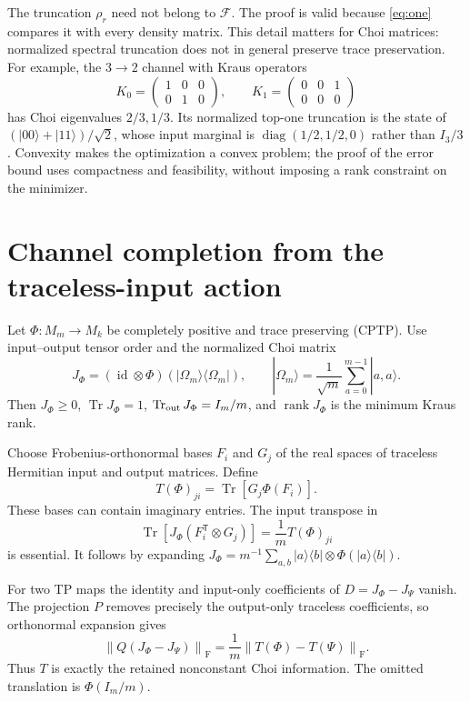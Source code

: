 \documentclass[11pt,a4paper]{article}
\newcommand{\Tr}{\operatorname{Tr}}
\newcommand{\rank}{\operatorname{rank}}
\newcommand{\id}{\operatorname{id}}
\newcommand{\F}{\mathrm F}
\newcommand{\norm}[1]{\left\lVert#1\right\rVert_{\F}}
\begin{document}
The truncation $\rho_r$ need not belong to $\mathcal F$. The proof is
valid because \eqref{eq:one} compares it with every density matrix.
This detail matters for Choi matrices: normalized spectral truncation
does not in general preserve trace preservation. For example, the
$3\to2$ channel with Kraus operators
\[
 K_0=\begin{pmatrix}1&0&0\\0&1&0\end{pmatrix},\qquad
 K_1=\begin{pmatrix}0&0&1\\0&0&0\end{pmatrix}
\]
has Choi eigenvalues $2/3,1/3$. Its normalized top-one truncation is
the state of $(|00\rangle+|11\rangle)/\sqrt2$, whose input marginal is
$\operatorname{diag}(1/2,1/2,0)$ rather than $I_3/3$.
Convexity makes the optimization a convex problem; the proof of the
error bound uses compactness and feasibility, without imposing a rank
constraint on the minimizer.

\section{Channel completion from the traceless-input action}
Let $\Phi:M_m\to M_k$ be completely positive and trace preserving
(CPTP). Use input--output tensor order and the normalized Choi matrix
\[
 J_\Phi=(\id\otimes\Phi)(|\Omega_m\rangle\langle\Omega_m|),\qquad
 |\Omega_m\rangle=\frac1{\sqrt m}\sum_{a=0}^{m-1}|a,a\rangle.
\]
Then $J_\Phi\ge0$, $\Tr J_\Phi=1$, $\Tr_{\rm out}J_\Phi=I_m/m$,
and $\rank J_\Phi$ is the minimum Kraus rank.

Choose Frobenius-orthonormal bases $F_i$ and $G_j$ of the real
spaces of traceless Hermitian input and output matrices. Define
\[
 T(\Phi)_{ji}=\Tr[G_j\Phi(F_i)].
\]
These bases can contain imaginary entries. The input transpose in
\begin{equation}\label{eq:choi-coordinate}
 \Tr[J_\Phi(F_i^{\mathsf T}\otimes G_j)]
 =\frac1m T(\Phi)_{ji}
\end{equation}
is essential. It follows by expanding
$J_\Phi=m^{-1}\sum_{a,b}|a\rangle\langle b|\otimes
\Phi(|a\rangle\langle b|)$.

For two TP maps the identity and input-only coefficients of
$D=J_\Phi-J_\Psi$ vanish. The projection $P$ removes precisely
the output-only traceless coefficients, so orthonormal expansion gives
\begin{equation}\label{eq:choi-norm}
 \norm{Q(J_\Phi-J_\Psi)}
 =\frac1m\norm{T(\Phi)-T(\Psi)}.
\end{equation}
Thus $T$ is exactly the retained nonconstant Choi information. The
omitted translation is $\Phi(I_m/m)$.
\end{document}
